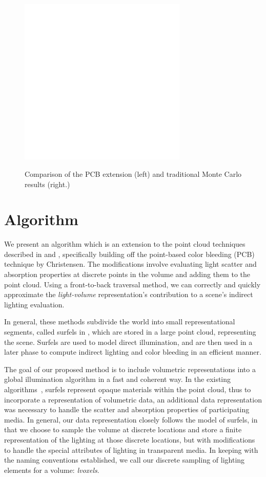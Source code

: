 \documentclass[12pt]{ucthesis}
\newcommand{\captionfonts}{\small\bf\ssp}
\begin{document}
\begin{figure}[h!]
    \centering
    \includegraphics[width=80mm]{img/diag/vol_step.pdf}
    \captionfonts
    \caption{Comparison of the PCB extension (left) and traditional Monte Carlo results (right.)}
    \label{fig:vol_step}
\end{figure}

\chapter{Algorithm}
\label{algorithm_sec}
We present an algorithm which is an extension to the point cloud techniques described in \cite{tabellion} and \cite{christensen:2008}, specifically building off the point-based color bleeding (PCB) technique by Christensen.  The modifications involve evaluating light scatter and absorption properties at discrete points in the volume and adding them to the point cloud.  Using a front-to-back traversal method, we can correctly and quickly approximate the \textit{light-volume} representation's contribution to a scene's indirect lighting evaluation.

In general, these methods subdivide the world into small representational segments, called surfels in \cite{christensen:2008}, which are stored in a large point cloud, representing the scene.  Surfels are used to model direct illumination, and are then used in a later phase to compute indirect lighting and color bleeding in an efficient manner.  

The goal of our proposed method is to include volumetric representations into a global illumination algorithm in a fast and coherent way.  In the existing algorithms~\cite{christensen:2008}, surfels represent opaque materials within the point cloud, thus to incorporate a representation of volumetric data, an additional data representation was necessary to handle the scatter and absorption properties of participating media.  In general, our data representation closely follows the model of surfels, in that we choose to sample the volume at discrete locations and store a finite representation of the lighting at those discrete locations, but with modifications to handle the special attributes of lighting in transparent media.  In keeping with the naming conventions established, we call our discrete sampling of lighting elements for a volume: \emph{lvoxels}.  
\end{document}
